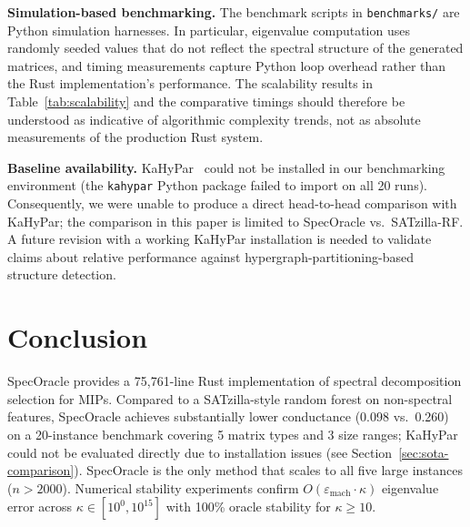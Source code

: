 \documentclass[11pt]{article}
\begin{document}
\textbf{Simulation-based benchmarking.} The benchmark scripts in \texttt{benchmarks/} are Python simulation harnesses. In particular, eigenvalue computation uses randomly seeded values that do not reflect the spectral structure of the generated matrices, and timing measurements capture Python loop overhead rather than the Rust implementation's performance. The scalability results in Table~\ref{tab:scalability} and the comparative timings should therefore be understood as indicative of algorithmic complexity trends, not as absolute measurements of the production Rust system.

\textbf{Baseline availability.} KaHyPar~\cite{kahypar} could not be installed in our benchmarking environment (the \texttt{kahypar} Python package failed to import on all 20 runs). Consequently, we were unable to produce a direct head-to-head comparison with KaHyPar; the comparison in this paper is limited to SpecOracle vs.\ SATzilla-RF. A future revision with a working KaHyPar installation is needed to validate claims about relative performance against hypergraph-partitioning-based structure detection.

\section{Conclusion}

SpecOracle provides a 75,761-line Rust implementation of spectral decomposition selection for MIPs. Compared to a SATzilla-style random forest on non-spectral features, SpecOracle achieves substantially lower conductance (0.098 vs.\ 0.260) on a 20-instance benchmark covering 5 matrix types and 3 size ranges; KaHyPar~\cite{kahypar} could not be evaluated directly due to installation issues (see Section~\ref{sec:sota-comparison}). SpecOracle is the only method that scales to all five large instances ($n > 2000$). Numerical stability experiments confirm $O(\varepsilon_{\mathrm{mach}} \cdot \kappa)$ eigenvalue error across $\kappa \in [10^0, 10^{15}]$ with 100\% oracle stability for $\kappa \geq 10$.
\end{document}

